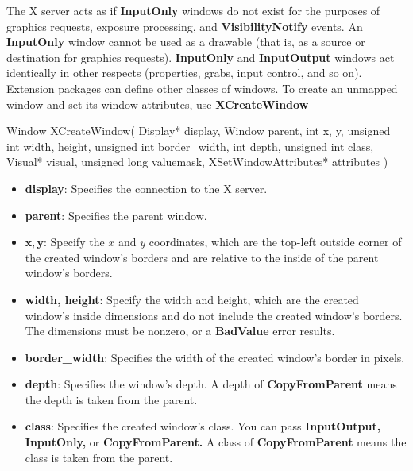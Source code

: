 \documentclass{report}
\begin{document}
\begin{itemize}
            \bigbreak \noindent 
            The X server acts as if \textbf{InputOnly} windows do not exist for the purposes of graphics requests, exposure processing, and \textbf{VisibilityNotify} events. An \textbf{InputOnly} window cannot be used as a drawable (that is, as a source or destination for graphics requests). \textbf{InputOnly} and \textbf{InputOutput} windows act identically in other respects (properties, grabs, input control, and so on). Extension packages can define other classes of windows.
            \bigbreak \noindent 
            To create an unmapped window and set its window attributes, use \textbf{XCreateWindow}
            \bigbreak \noindent 
            \begin{cppcode}
                Window XCreateWindow(
                    Display* display, 
                    Window parent,
                    int x, y, 
                    unsigned int width, height, 
                    unsigned int border_width,
                    int depth,
                    unsigned int class,
                    Visual* visual,
                    unsigned long valuemask,
                    XSetWindowAttributes* attributes
                )
            \end{cppcode}
            \bigbreak \noindent
            \begin{itemize}
                \item \textbf{display}: Specifies the connection to the X server.
                \item \textbf{parent}: Specifies the parent window.
                \item \textbf{$\mathbf{x}, \mathbf{y}$}: Specify the $x$ and $y$ coordinates, which are the top-left outside corner of the created window’s borders and are relative to the inside of the parent window’s borders.
                \item \textbf{width, height}: Specify the width and height, which are the created window’s inside dimensions and do not include the created window’s borders. The dimensions must be nonzero, or a \textbf{BadValue} error results.
                \item \textbf{border\_width}: Specifies the width of the created window’s border in pixels.
                \item \textbf{depth}: Specifies the window’s depth. A depth of \textbf{CopyFromParent} means the depth is taken from the parent.
                \item \textbf{class}: Specifies the created window’s class. You can pass \textbf{InputOutput,} \textbf{InputOnly,} or \textbf{CopyFromParent.} A class of \textbf{CopyFromParent} means the class is taken from the parent.

\end{itemize}
\end{itemize}
\end{document}
